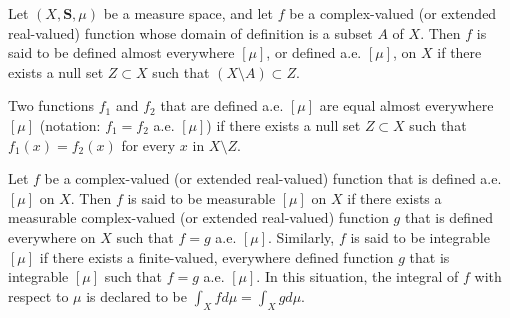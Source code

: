 Let $(X, \mathbf{S}, \mu)$ be a measure space, and let $f$ be a complex-valued (or extended real-valued) function whose domain of definition is a subset $A$ of $X$. Then $f$ is said to be defined almost everywhere $[\mu]$, or defined a.e. $[\mu]$, on $X$ if there exists a null set $Z \subset X$ such that $(X \setminus A) \subset Z$.

Two functions $f_1$ and $f_2$ that are defined a.e. $[\mu]$ are equal almost everywhere $[\mu]$ (notation: $f_1 = f_2$ a.e. $[\mu]$) if there exists a null set $Z \subset X$ such that $f_1(x) = f_2(x)$ for every $x$ in $X \setminus Z$.

Let $f$ be a complex-valued (or extended real-valued) function that is defined a.e. $[\mu]$ on $X$. Then $f$ is said to be measurable $[\mu]$ on $X$ if there exists a measurable complex-valued (or extended real-valued) function $g$ that is defined everywhere on $X$ such that $f = g$ a.e. $[\mu]$. Similarly, $f$ is said to be integrable $[\mu]$ if there exists a finite-valued, everywhere defined function $g$ that is integrable $[\mu]$ such that $f = g$ a.e. $[\mu]$. In this situation, the integral of $f$ with respect to $\mu$ is declared to be $\int_X f d\mu = \int_X g d\mu$.

